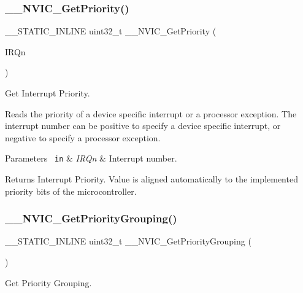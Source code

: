 \subsubsection{\texorpdfstring{\_\_NVIC\_GetPriority()}{\_\_NVIC\_GetPriority()}}
{\footnotesize\ttfamily \+\_\+\+\_\+\+S\+T\+A\+T\+I\+C\+\_\+\+I\+N\+L\+I\+NE uint32\+\_\+t \+\_\+\+\_\+\+N\+V\+I\+C\+\_\+\+Get\+Priority (\begin{DoxyParamCaption}\item[{\mbox{\hyperlink{group___configuration__section__for___c_m_s_i_s_ga7e1129cd8a196f4284d41db3e82ad5c8}{I\+R\+Qn\+\_\+\+Type}}}]{I\+R\+Qn }\end{DoxyParamCaption})}



Get Interrupt Priority. 

Reads the priority of a device specific interrupt or a processor exception. The interrupt number can be positive to specify a device specific interrupt, or negative to specify a processor exception. 
\begin{DoxyParams}[1]{Parameters}
\mbox{\texttt{ in}}  & {\em I\+R\+Qn} & Interrupt number. \\
\hline
\end{DoxyParams}
\begin{DoxyReturn}{Returns}
Interrupt Priority. Value is aligned automatically to the implemented priority bits of the microcontroller. 
\end{DoxyReturn}
\mbox{\label{group___c_m_s_i_s___core___n_v_i_c_functions_ga9b894af672df4373eb637f8288845c05}} 
\subsubsection{\texorpdfstring{\_\_NVIC\_GetPriorityGrouping()}{\_\_NVIC\_GetPriorityGrouping()}}
{\footnotesize\ttfamily \+\_\+\+\_\+\+S\+T\+A\+T\+I\+C\+\_\+\+I\+N\+L\+I\+NE uint32\+\_\+t \+\_\+\+\_\+\+N\+V\+I\+C\+\_\+\+Get\+Priority\+Grouping (\begin{DoxyParamCaption}\item[{void}]{ }\end{DoxyParamCaption})}



Get Priority Grouping. 

